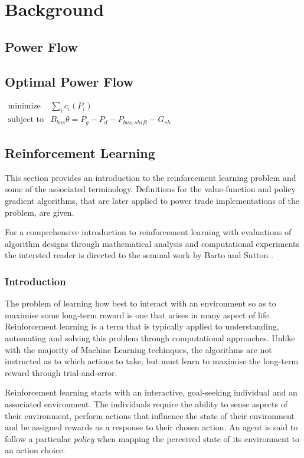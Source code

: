 \chapter{Background}

\section{Power Flow}

\section{Optimal Power Flow}

$
  \begin{array}{ll}
  \mbox{minimize}   & \sum_i c_i (P_i) \\
  \mbox{subject to} & B_{bus} \theta = P_g - P_d - P_{bus,shift} - G_{sh}
  \end{array}
$

\section{Reinforcement Learning}
This section provides an introduction to the reinforcement learning problem and
some of the associated terminology.  Definitions for the value-function and
policy gradient algorithms, that are later applied to power trade
implementations of the problem, are given.

For a comprehensive introduction to reinforcement learning with evaluations of
algorithm designs through mathematical analysis and computational experiments
the intersted reader is directed to the seminal work by Barto and Sutton
\cite{suttonbarto:1998}.

\subsection{Introduction}
The problem of learning how best to interact with an environment so as to
maximise some long-term reward is one that arises in many aspect of life.
Reinforcement learning is a term that is typically applied to
understanding, automating and solving this problem through computational
approaches. Unlike with the majority of Machine Learning techinques, the
algorithms are not instructed as to which actions to take, but must learn to
maximise the long-term reward through trial-and-error.

Reinforcement learning starts with an interactive, goal-seeking individual and
an associated environment.  The individuals require the ability to sense
aspects of their environment, perform actions that influence the state of their
environment and be assigned rewards as a response to their chosen action.  An
agent is said to follow a particular \textit{policy} when mapping the
perceived state of its environment to an action choice.

